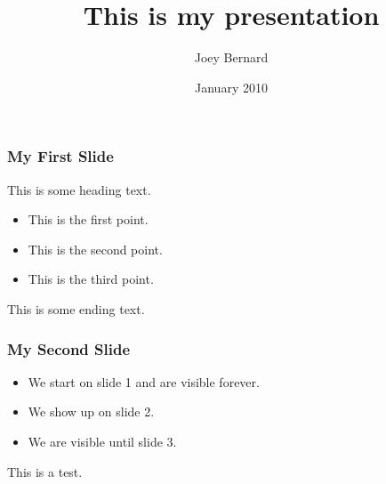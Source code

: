 \documentclass{beamer}
\title{This is my presentation}
\author{Joey Bernard}
\date{January 2010}
\begin{document}
\maketitle

\begin{frame}
   \frametitle{My First Slide}
   This is some heading text.
   \begin{itemize}
      \item This is the first point.
      \item This is the second point.
      \item This is the third point.
   \end{itemize}
   This is some ending text.
\end{frame}
\begin{frame}
   \frametitle{My Second Slide}
   \begin{itemize}
      \item<1-> We start on slide 1 and are visible forever.
      \item<2-> We show up on slide 2.
      \item<2-3> We are visible until slide 3.
   \end{itemize}
This is a test.
\end{frame}
\end{document}
